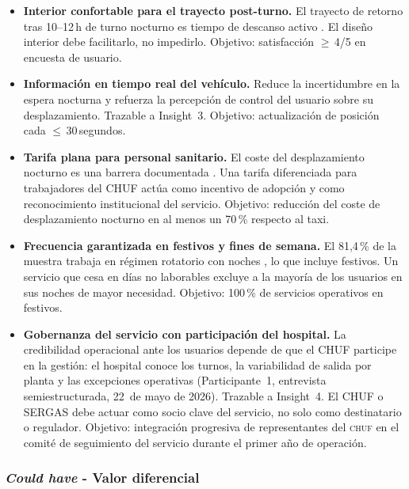 \begin{itemize}

	\item \textbf{Interior confortable para el trayecto post-turno.}
	El trayecto de retorno tras 10--12\,h de turno nocturno es tiempo
	de descanso activo \parencite{LouridoRegueira2026}. El diseño
	interior debe facilitarlo, no impedirlo.
	Objetivo: satisfacción $\geq$\,4/5 en encuesta de usuario.

	\item \textbf{Información en tiempo real del vehículo.}
	Reduce la incertidumbre en la espera nocturna y refuerza la
	percepción de control del usuario sobre su desplazamiento.
	Trazable a Insight~3.
	Objetivo: actualización de posición cada $\leq$\,30\,segundos.

	\item \textbf{Tarifa plana para personal sanitario.}
	El coste del desplazamiento nocturno es una barrera documentada
	\parencite{LouridoRegueira2026}. Una tarifa diferenciada para
	trabajadores del CHUF actúa como incentivo de adopción y como
	reconocimiento institucional del servicio.
	Objetivo: reducción del coste de desplazamiento nocturno en al
	menos un 70\,\% respecto al taxi.

	\item \textbf{Frecuencia garantizada en festivos y fines de semana.}
	El 81,4\,\% de la muestra trabaja en régimen rotatorio con noches
	\parencite{LouridoRegueira2026}, lo que incluye festivos. Un
	servicio que cesa en días no laborables excluye a la mayoría de
	los usuarios en sus noches de mayor necesidad.
	Objetivo: 100\,\% de servicios operativos en festivos.

	\item \textbf{Gobernanza del servicio con participación del hospital.}
	La credibilidad operacional ante los usuarios depende de que el CHUF
	participe en la gestión: el hospital conoce los turnos, la variabilidad
	de salida por planta y las excepciones operativas (Participante~1,
	entrevista semiestructurada, 22~de mayo de 2026). Trazable a Insight~4.
	El CHUF o SERGAS debe actuar como socio clave del servicio, no solo
	como destinatario o regulador.
	Objetivo: integración progresiva de representantes del \textsc{chuf}
	en el comité de seguimiento del servicio durante el primer año
	de operación.

\end{itemize}

\subsubsection{\textit{Could have} - Valor diferencial}
\label{sec:moscow-could}

